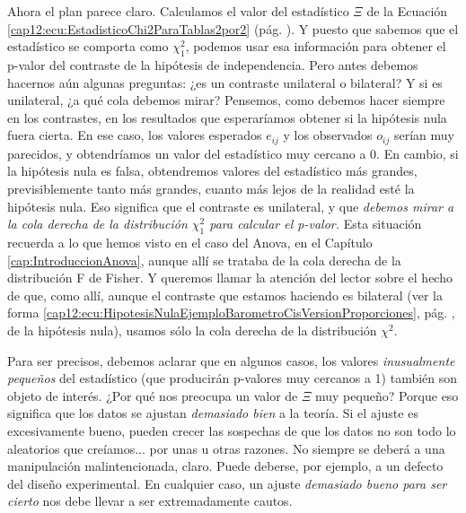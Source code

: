 Ahora el plan parece claro. Calculamos el valor del estadístico $\Xi$ de la Ecuación
\ref{cap12:ecu:EstadisticoChi2ParaTablas2por2} (pág.
\pageref{cap12:ecu:EstadisticoChi2ParaTablas2por2}). Y puesto que sabemos que el estadístico se
comporta como $\chi^2_1$, podemos usar esa información para obtener el p-valor del contraste de la hipótesis de independencia. Pero antes debemos hacernos aún algunas preguntas: ¿es un contraste unilateral o bilateral? Y si es unilateral, ¿a qué cola debemos mirar? Pensemos, como debemos hacer siempre en los contrastes, en
los resultados que esperaríamos obtener si la hipótesis nula fuera cierta. En ese caso, los valores
esperados $e_{ij}$ y los observados $o_{ij}$ serían muy parecidos, y obtendríamos un valor del
estadístico muy cercano a 0. En cambio, si la hipótesis nula es falsa, obtendremos valores del
estadístico más grandes, previsiblemente tanto más grandes, cuanto más lejos de la realidad esté la
hipótesis nula. Eso significa que el contraste es unilateral, y que {\em debemos mirar a la cola
derecha de la distribución $\chi^2_1$ para calcular el p-valor.} Esta situación recuerda a lo que
hemos visto en el caso del  Anova, en el Capítulo \ref{cap:IntroduccionAnova}, aunque allí se
trataba de la cola derecha de la distribución F de Fisher. Y queremos llamar la atención del lector sobre el hecho de que, como allí, aunque el contraste que estamos haciendo es bilateral (ver la forma \ref{cap12:ecu:HipotesisNulaEjemploBarometroCisVersionProporciones}, pág. \pageref{cap12:ecu:HipotesisNulaEjemploBarometroCisVersionProporciones}, de la hipótesis nula), usamos sólo la cola derecha de la distribución $\chi^2$.

Para ser precisos, debemos aclarar que en algunos casos, los valores {\em inusualmente pequeños}
del estadístico (que producirán p-valores muy cercanos a 1) también son objeto de interés. ¿Por qué
nos preocupa un valor de $\Xi$ muy pequeño? Porque eso significa que los datos se ajustan {\em
demasiado bien} a la teoría. Si el ajuste es excesivamente bueno, pueden crecer las sospechas de
que los datos no son todo lo aleatorios que creíamos... por unas u otras razones. No siempre se
deberá a una manipulación malintencionada, claro. Puede deberse, por ejemplo, a un defecto del
diseño experimental. En cualquier caso, un ajuste {\em demasiado bueno para ser cierto} nos debe
llevar a ser extremadamente cautos.

